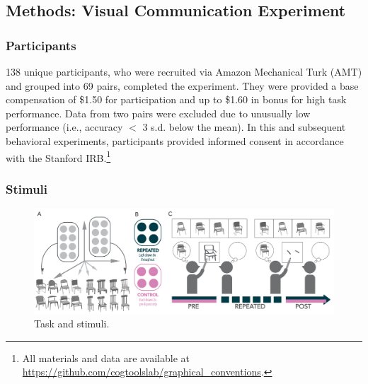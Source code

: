 \documentclass[10pt,letterpaper]{article}
\begin{document}

\subsection{Methods: Visual Communication Experiment}

\subsubsection{Participants} 138 unique participants, who were recruited via Amazon Mechanical Turk (AMT) and grouped into 69 pairs, completed the experiment.
They were provided a base compensation of \$1.50 for participation and up to \$1.60 in bonus for high task performance.
Data from two pairs were excluded due to unusually low performance (i.e., accuracy $<$ 3 s.d. below the mean).
In this and subsequent behavioral experiments, participants provided informed consent in accordance with the Stanford IRB.\footnote{All materials and data are available at \url{https://github.com/cogtoolslab/graphical_conventions}.}

\subsubsection{Stimuli} 

\begin{figure}
\includegraphics[width=\linewidth]{figures/task_stimuli.pdf}
\caption{Task and stimuli. } 
\label{task_stimuli}
\end{figure}
\end{document}
